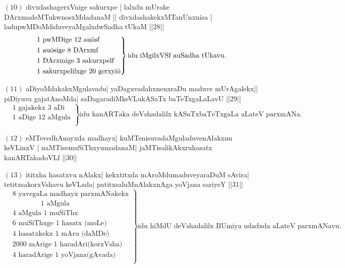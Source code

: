 $(10)$ divxdashagerxVnige sakurxpe | lalxdu mUrake DArxmadeMTukwnosxMdadanaM || divxdashakekxMTanUnxnisa | ladupwMDoMdiduveyaMgalxdwSadha tUkaM ||28||
\begin{equation*}
\left.
\begin{aligned}
&\text{$1$ pwMDige $12$ au\char'366sf}\\
&\text{$1$ au\char'366sige $8$ DArxmf}\\
&\text{$1$ DArxmige $3$ sakurxpelf}\\
&\text{$1$ sakurxpelilxge $20$ gerxyi\char'366}\\
\end{aligned}
\right\}
\text {idu iMgilxVSf auSadha tUkavu.}
\end{equation*}

$(11)$ aDiyoMdakakxMgulavadu| yaDaguvadahxnenxraDu maduve mUrAgalekx|| piDiyuva gajatAnoMda| saDagaradiMkeVLukASaTx baTeTxgaLaLavU ||29||
\begin{equation*}
\left.
\begin{aligned}
&\text{$1$ gajakekx $3$ aDi}\\
&\text{$1$ aDige $12$ aMgula}\\
\end{aligned}
\right\}
\text {idu kanARTaka deVshadalilx kASaTxbaTeTxgaLa aLateV parxmANa.}
\end{equation*}

$(12)$ eMTevedhAnayxda madhayx| kuMTenisuvadaMguladuvenAlakxnu keVLinxV | naMTisemuSiThxyumadanaM| jaMTisalikAkxruhasatx kanARTakadoVLf ||30||

\eject

$(13)$ ititxha hasatxvu nAlakx| kekxtitxda mAroMdumaduveyaraDuM sAvira| tetitxsakorxVshavu keVLada| patitxsaluMnAlakxnAga yoVjana sariyeY ||31||
\begin{equation*}
\left.
\begin{aligned}
&\text{$8$ yavegaLa madhayx parxmANakekx}\\
&\quad\quad\quad\quad\text{$1$ aMgula}\\
&\text{$4$ aMgula $1$ muSiThx}\\
&\text{$6$ muSiThxge $1$ hasatx (moLe)}\\
&\text{$4$ hasatxkekx $1$ mAru (daMDe)}\\
&\text{$2000$ mArige $1$ haradAri(korxVsha)}\\
&\text{$4$ haradArige $1$ yoVjana(gAvada)}\\
\end{aligned}
\right\}
\text {idu hiMdU deVshadalilx BUmiya udadxda aLateV parxmANavu.}
\end{equation*}

